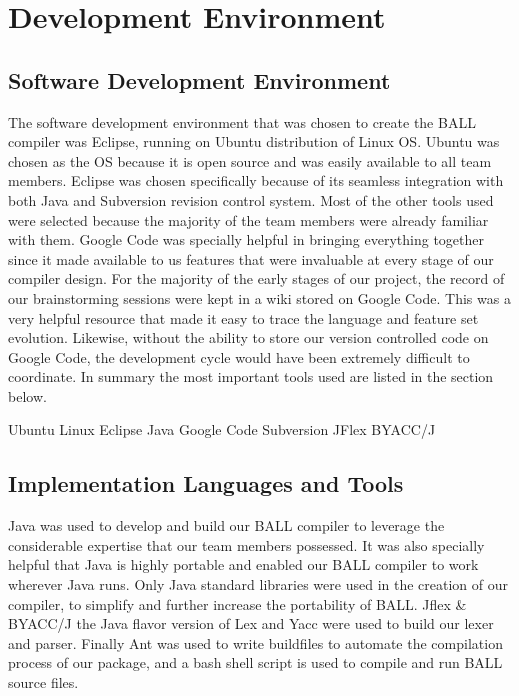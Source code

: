 \chapter{Development Environment}\label{DevelEnv}

\section{Software Development Environment}

The software development environment that was chosen to create the
BALL compiler was Eclipse, running on Ubuntu distribution of Linux
OS. Ubuntu was chosen as the OS because it is open source and was
easily available to all team members. Eclipse was chosen specifically
because of its seamless integration with both Java and Subversion
revision control system. Most of the other tools used were selected
because the majority of the team members were already familiar with
them. Google Code was specially helpful in bringing everything
together since it made available to us features that were invaluable
at every stage of our compiler design. For the majority of the early
stages of our project, the record of our brainstorming sessions were
kept in a wiki stored on Google Code. This was a very helpful resource
that made it easy to trace the language and feature set
evolution. Likewise, without the ability to store our version
controlled code on Google Code, the development cycle would have been
extremely difficult to coordinate. In summary the most important tools
used are listed in the section below.

Ubuntu Linux
Eclipse
Java
Google Code
Subversion
JFlex
BYACC/J

\section{Implementation Languages and Tools}

Java was used to develop and build our BALL compiler to leverage the
considerable expertise that our team members possessed. It was also
specially helpful that Java is highly portable and enabled our BALL
compiler to work wherever Java runs. Only Java standard libraries were
used in the creation of our compiler, to simplify and further increase
the portability of BALL. Jflex \& BYACC/J the Java flavor version of
Lex and Yacc were used to build our lexer and parser. Finally Ant was
used to write buildfiles to automate the compilation process of our
package, and a bash shell script is used to compile and run BALL
source files.  
